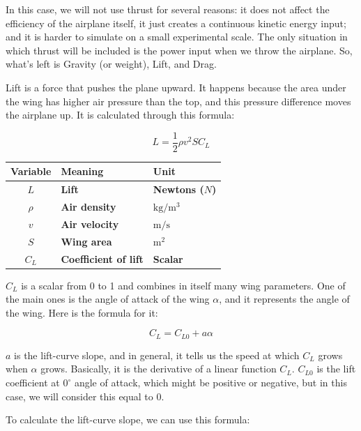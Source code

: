 \documentclass[12pt]{article}
\begin{document}
\vspace{5mm}

In this case, we will not use thrust for several reasons: it does not affect the efficiency of the airplane itself, it just creates a continuous kinetic energy input; and it is harder to simulate on a small experimental scale. The only situation in which thrust will be included is the power input when we throw the airplane. So, what's left is Gravity (or weight), Lift, and Drag.

Lift is a force that pushes the plane upward. It happens because the area under the wing has higher air pressure than the top, and this pressure difference moves the airplane up. It is calculated through this formula:

\[
L = \frac{1}{2}\rho v^2 S C_L
\]

\renewcommand{\arraystretch}{2}
\begin{center}
\begin{tabular}{c|l|l}
\toprule
\textbf{Variable} & \textbf{Meaning} & \textbf{Unit} \\
\midrule
\textbf{$L$} & \textbf{Lift} & \textbf{Newtons ($N$)} \\
\midrule
\textbf{$\rho$} & \textbf{Air density} & $\mathrm{kg/m^3}$ \\
\midrule
\textbf{$v$} & \textbf{Air velocity} & $\mathrm{m/s}$ \\
\midrule
\textbf{$S$} & \textbf{Wing area} & $\mathrm{m^2}$ \\
\midrule
\textbf{$C_L$} & \textbf{Coefficient of lift} & \textbf{Scalar} \\
\bottomrule
\end{tabular}
\end{center}

\vspace{5mm}

$C_L$ is a scalar from 0 to 1 and combines in itself many wing parameters. One of the main ones is the angle of attack of the wing $\alpha$, and it represents the angle of the wing. Here is the formula for it:

\[
C_L = C_{L0} + a\alpha
\]

$a$ is the lift-curve slope, and in general, it tells us the speed at which $C_L$ grows when $\alpha$ grows. Basically, it is the derivative of a linear function $C_L$. $C_{L0}$ is the lift coefficient at \(0^\circ\) angle of attack, which might be positive or negative, but in this case, we will consider this equal to 0.

To calculate the lift-curve slope, we can use this formula:
\end{document}
